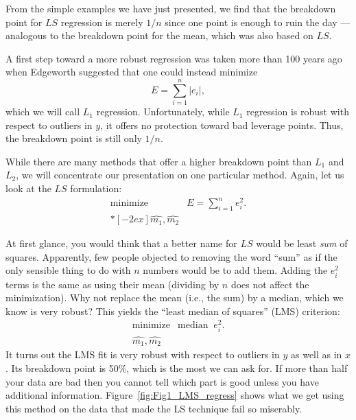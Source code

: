 From the simple examples we have just presented, we find that the breakdown point for $LS$ 
regression is merely $1/n$ since one point is enough to ruin the day --- analogous to the breakdown 
point for the mean, which was also based on $LS$.
	
A first step toward a more robust regression was taken more than 100 years ago when 
Edgeworth suggested that one could instead minimize
\begin{equation}
E = \sum^n_{i=1} |e_i|,
\end{equation}	 
which we will call $L_1$ regression.  Unfortunately, while $L_1$ regression is robust with respect to 
outliers in $y$, it offers no protection toward bad leverage points.  Thus, the breakdown point is 
still only $1/n$.
	
While there are many methods that offer a higher breakdown point than $L_1$ and $L_2$, we will 
concentrate our presentation on one particular method.  Again, let us look at the $LS$ formulation:
$$
\begin{array}{cc}
\mbox{minimize} & \displaystyle E = \sum^n_{i=1} e^2_i. \\*[-2ex]
\hat{m_1}, \hat{m_2} \end{array}
$$
	 

At first glance, you would think that a better name for $LS$ would be least \emph{sum} of squares.  
Apparently, few people objected to removing the word ``sum'' as if the only sensible thing to do 
with $n$ numbers would be to add them.  Adding the $e_i^2$ terms is the same as using their mean (dividing 
by $n$ does not affect the minimization).  Why not replace the mean (i.e., the sum) by a median, which we know is 
very robust?  This yields the ``least median of squares'' (LMS) criterion:
\begin{equation}
\begin{array}{cc}
\mbox{minimize} & \mbox{median } \ e^2_i. \\
    \hat{m_1}, \hat{m_2} \end{array}
\end{equation}	 
It turns out the LMS fit is very robust with respect to outliers in $y$ as well as in $x$.  Its breakdown 
point is 50\%, which is the most we can ask for.  If more than half your data are bad then you cannot tell
which part is good unless you have additional information.
Figure~\ref{fig:Fig1_LMS_regress} shows what we get
using this method on the data that made the LS technique fail so miserably.
	
